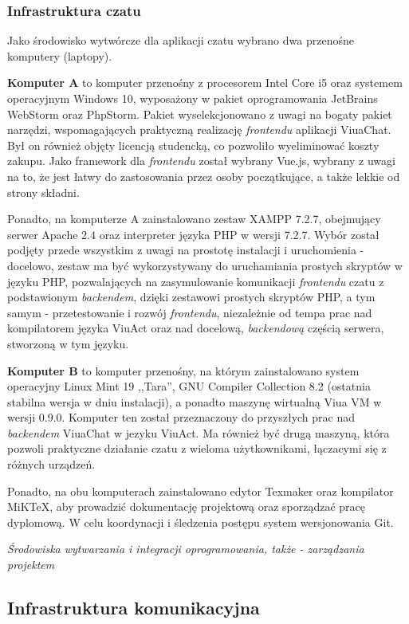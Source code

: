 \documentclass[11pt,oneside,a4paper,titlepage,onecolumn]{article}
\begin{document}
\subsubsection{Infrastruktura czatu}
Jako środowisko wytwórcze dla aplikacji czatu wybrano dwa przenośne komputery (laptopy).

\textbf{Komputer A} to komputer przenośny z procesorem Intel Core i5 oraz systemem operacyjnym Windows 10,
wyposażony w pakiet oprogramowania JetBrains WebStorm oraz PhpStorm. Pakiet wyselekcjonowano z uwagi
na bogaty pakiet narzędzi, wspomagających praktyczną realizację \textit{frontendu} aplikacji ViuaChat.
Był on również objęty licencją studencką, co pozwoliło wyeliminować koszty zakupu. Jako framework dla
\textit{frontendu} został wybrany Vue.js, wybrany z uwagi na to, że jest łatwy do zastosowania
przez osoby początkujące, a także lekkie od strony składni.

Ponadto, na komputerze A zainstalowano zestaw XAMPP 7.2.7, obejmujący serwer Apache 2.4 oraz interpreter 
języka PHP w wersji 7.2.7. Wybór został podjęty przede wszystkim z uwagi na prostotę instalacji i
uruchomienia - docelowo, zestaw ma być wykorzystywany do uruchamiania prostych skryptów w języku
PHP, pozwalających na zasymulowanie komunikacji \textit{frontendu} czatu z podstawionym \textit{backendem},
dzięki zestawowi prostych skryptów PHP, a tym samym - przetestowanie i rozwój \textit{frontendu}, 
niezależnie od tempa prac nad kompilatorem języka ViuAct oraz nad docelową, \textit{backendową} częścią 
serwera, stworzoną w tym języku.

\textbf{Komputer B} to komputer przenośny, na którym zainstalowano system operacyjny Linux Mint 19 
,,Tara'', GNU Compiler Collection 8.2 (ostatnia stabilna wersja w dniu instalacji), a ponadto maszynę
wirtualną Viua VM w wersji 0.9.0. Komputer ten został przeznaczony do przyszłych prac nad 
\textit{backendem} ViuaChat w jezyku ViuAct. Ma również być drugą maszyną, która pozwoli praktyczne
działanie czatu z wieloma użytkownikami, łączacymi się z różnych urządzeń.

Ponadto, na obu komputerach zainstalowano edytor Texmaker oraz kompilator MiKTeX, aby prowadzić
dokumentację projektową oraz sporządzać pracę dyplomową. W celu koordynacji i śledzenia postępu
system wersjonowania Git.

\emph{Środowiska wytwarzania i integracji oprogramowania, także - zarządzania projektem}

\subsection{Infrastruktura komunikacyjna}
\end{document}
